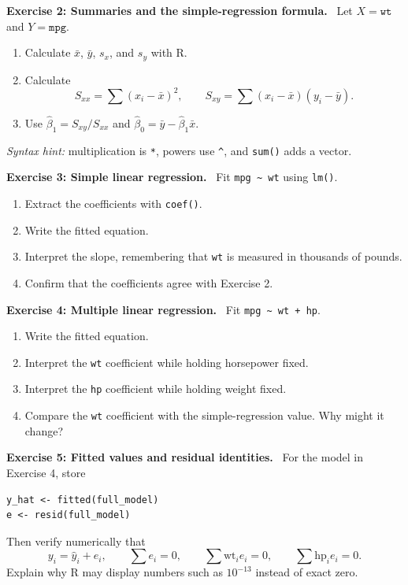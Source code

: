 \documentclass[11pt]{article}
\newenvironment{exercise}[1]
 {\par\medskip\noindent\color{navy}\textbf{Exercise #1.}\color{black}\ }
 {\par\medskip}
\begin{document}
\begin{exercise}{2: Summaries and the simple-regression formula}
Let $X=\texttt{wt}$ and $Y=\texttt{mpg}$.
\begin{enumerate}[label=(\alph*),leftmargin=*]
 \item Calculate $\bar x$, $\bar y$, $s_x$, and $s_y$ with R.
 \item Calculate
 \[
  S_{xx}=\sum(x_i-\bar x)^2,
  \qquad
  S_{xy}=\sum(x_i-\bar x)(y_i-\bar y).
 \]
 \item Use $\widehat\beta_1=S_{xy}/S_{xx}$ and
 $\widehat\beta_0=\bar y-\widehat\beta_1\bar x$.
\end{enumerate}
\emph{Syntax hint:} multiplication is \texttt{*}, powers use \texttt{\^},
and \texttt{sum()} adds a vector.
\end{exercise}

\begin{exercise}{3: Simple linear regression}
Fit \texttt{mpg \textasciitilde{} wt} using \texttt{lm()}.
\begin{enumerate}[label=(\alph*),leftmargin=*]
 \item Extract the coefficients with \texttt{coef()}.
 \item Write the fitted equation.
 \item Interpret the slope, remembering that \texttt{wt} is measured in
 thousands of pounds.
 \item Confirm that the coefficients agree with Exercise 2.
\end{enumerate}
\end{exercise}

\begin{exercise}{4: Multiple linear regression}
Fit \texttt{mpg \textasciitilde{} wt + hp}.
\begin{enumerate}[label=(\alph*),leftmargin=*]
 \item Write the fitted equation.
 \item Interpret the \texttt{wt} coefficient while holding horsepower fixed.
 \item Interpret the \texttt{hp} coefficient while holding weight fixed.
 \item Compare the \texttt{wt} coefficient with the simple-regression value.
 Why might it change?
\end{enumerate}
\end{exercise}

\begin{exercise}{5: Fitted values and residual identities}
For the model in Exercise 4, store
\begin{lstlisting}
y_hat <- fitted(full_model)
e <- resid(full_model)
\end{lstlisting}
Then verify numerically that
\[
 y_i=\widehat y_i+e_i,
 \qquad
 \sum e_i=0,
 \qquad
 \sum \mathrm{wt}_i e_i=0,
 \qquad
 \sum \mathrm{hp}_i e_i=0.
\]
Explain why R may display numbers such as $10^{-13}$ instead of exact zero.
\end{exercise}
\end{document}
